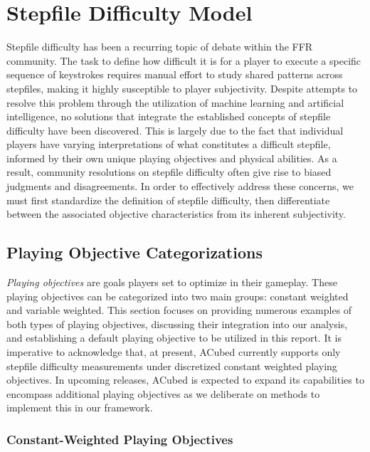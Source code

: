 \section{Stepfile Difficulty Model}
\label{sec:stepfile_difficulty}

Stepfile difficulty has been a recurring topic of debate within the FFR community. The task to define how difficult it is for a player to execute a specific sequence of keystrokes requires manual effort to study shared patterns across stepfiles, making it highly susceptible to player subjectivity. Despite attempts to resolve this problem through the utilization of machine learning and artificial intelligence, no solutions that integrate the established concepts of stepfile difficulty have been discovered. This is largely due to the fact that individual players have varying interpretations of what constitutes a difficult stepfile, informed by their own unique playing objectives and physical abilities. As a result, community resolutions on stepfile difficulty often give rise to biased judgments and disagreements. In order to effectively address these concerns, we must first standardize the definition of stepfile difficulty, then differentiate between the associated objective characteristics from its inherent subjectivity.

\subsection{Playing Objective Categorizations}

\textit{Playing objectives} are goals players set to optimize in their gameplay. These playing objectives can be categorized into two main groups: constant weighted and variable weighted. This section focuses on providing numerous examples of both types of playing objectives, discussing their integration into our analysis, and establishing a default playing objective to be utilized in this report. It is imperative to acknowledge that, at present, ACubed currently supports only stepfile difficulty measurements under discretized constant weighted playing objectives. In upcoming releases, ACubed is expected to expand its capabilities to encompass additional playing objectives as we deliberate on methods to implement this in our framework.

\subsubsection{Constant-Weighted Playing Objectives}

